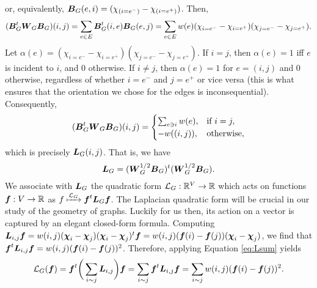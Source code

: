 or, equivalently, $\vb*{B}_G(e,i) = (\chi_{(i=e^-)}-\chi_{(i=e^+)})$. Then,
\begin{equation*}
   ( \vb*{B}_G^t\vb*{W}_G\vb*{B}_G)(i,j)=\sum_{e\in E} \vb*{B}_G^t(i,e)\vb*{B}_G(e,j)=\sum_{e\in E}w(e)(\chi_{i=e^-}-\chi_{i=e^+})(\chi_{j=e^-}-\chi_{j=e^+}).
\end{equation*}
Let $\alpha(e)=(\chi_{i=e^-}-\chi_{i=e^+})(\chi_{j=e^-}-\chi_{j=e^+})$. If $i=j$, then $\alpha(e)=1$ iff $e$ is incident to $i$, and 0 otherwise. If $i\neq j$, then $\alpha(e)=1$ for $e=(i,j)$ and 0 otherwise, regardless of whether $i=e^-$ and $j=e^+$ or vice versa (this is what ensures that the orientation we chose for the edges is inconsequential). Consequently, 
\begin{align*}
(\vb*{B}_G^t\vb*{W}_G\vb*{B}_G)(i,j) = 
\begin{cases}
\sum_{e\ni i} w(e),&\text{if } i=j,\\
-w((i,j)),&\text{otherwise}, 
\end{cases}
\end{align*}
which is precisely $\vb*{L}_G(i,j)$. That is, we have 
 \begin{equation}
 \label{eq:L=BTB}
 \vb*{L}_G=(\vb*{W}_G^{1/2}\vb*{B}_G)^t(\vb*{W}_G^{1/2}\vb*{B}_G).
 \end{equation}
 We associate with $\vb*{L}_G$ the quadratic form $\mathcal{L}_G:\mathbb{R}^V\to \mathbb{R}$ which acts on functions $\vb*{f}:V\to \mathbb{R}$ as $f\xmapsto{\mathcal{L}_G} \vb*{f}^t \vb*{L}_G \vb*{f}$.
The Laplacian quadratic form will be crucial in our study of the geometry of graphs. Luckily for us then, its action on a vector is captured by an elegant closed-form formula. 
Computing 
$\vb*{L}_{i,j}\vb*{f} = w(i,j)(\boldsymbol{\chi}_i -\boldsymbol{\chi}_j)(\boldsymbol{\chi}_i-\boldsymbol{\chi}_j)^t \vb*{f} = w(i,j)(\vb*{f}(i)-\vb*{f}(j))(\boldsymbol{\chi}_i-\boldsymbol{\chi}_j)$,
we find that 
$\vb*{f}^t \vb*{L}_{i,j} \vb*{f} = w(i,j)(\vb*{f}(i)-\vb*{f}(j))^2$.
Therefore, applying Equation \ref{eq:Lsum} yields 
\begin{equation}
\label{eq:Lf}
    \mathcal{L}_G(\vb*{f}) = \vb*{f}^t \bigg(\sum_{i\sim j} \vb*{L}_{i,j}\bigg) \vb*{f} = \sum_{i\sim j}\vb*{f}^t \vb*{L}_{i,j} \vb*{f}= \sum_{i\sim j} w(i,j)(\vb*{f}(i)-\vb*{f}(j))^2.
\end{equation}


